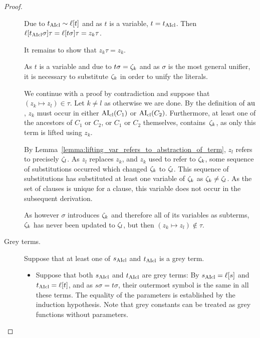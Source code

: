 \documentclass[,%
	paper=a4,%
	DIV14, %
	twoside=false,%
	liststotoc,
	bibtotoc,
	draft=false,%
	numbers=noendperiod
]{scrartcl}
\begin{document}
\begin{proof}
\begin{description}
\begin{compactitem}
				Due to $t_{\operatorname{AIcl}} \sim \ell[t]$ and as $t$ is a variable, $t=t_{\operatorname{AIcl}}$.
				Then $\ell[t_{\operatorname{AIcl}}\sigma]\tau = \ell[t\sigma]\tau = z_k\tau$.

				It remains to show that $z_k\tau = z_k$.

				As $t$ is a variable and due to $t\sigma = \zeta_{k}$ and as $\sigma$ is the most general unifier, it is necessary to substitute $\zeta_{k}$ in order to unify the literals. 

				We continue with a proof by contradiction and suppose that $(z_k \mapsto z_l) \in \tau$. Let $k\neq l$ as otherwise we are done.
				By the definition of $\operatorname{au}$, $z_k$ must occur in either $\operatorname{AI}_\mathrm{cl}(C_1)$ or $\operatorname{AI}_\mathrm{cl}(C_2)$.
				Furthermore, at least one of the ancestors of $C_1$ or $C_2$, or $C_1$ or $C_2$ themselves, contains~$\zeta_{k}$, as only this term is lifted using $z_k$.

				By Lemma~\ref{lemma:lifting_var_refers_to_abstraction_of_term}, $z_l$ refers to precisely $\zeta_{l}$. %
				As $z_l$ replaces $z_k$, and $z_k$ used to refer to $\zeta_{k}$,
				some sequence of substitutions occurred which changed $\zeta_{k}$ to $\zeta_{l}$.
				This sequence of substitutions has substituted at least one variable of $\zeta_{k}$ as $\zeta_{k}\neq\zeta_{l}$.
				As the set of clauses is unique for a clause, this variable does not occur in the subsequent derivation.

				As however $\sigma$ introduces $\zeta_{k}$ and therefore all of its variables as subterms, 
				$\zeta_{k}$ has never been updated to $\zeta_{l}$, but then $(z_k \mapsto z_l) \not\in \tau$.

			\end{compactitem}

		\item[Grey terms.]
			Suppose that at least one of $s_{\operatorname{AIcl}}$ and $t_{\operatorname{AIcl}}$ is a grey term.
			\begin{itemize}
				\item
					Suppose that both $s_{\operatorname{AIcl}}$ and $t_{\operatorname{AIcl}}$ are grey terms:
					By $s_{\operatorname{AIcl}} = \ell[s]$ and 
					$t_{\operatorname{AIcl}} = \ell[t]$, and as $s\sigma = t\sigma$, their outermost symbol is the same in all these terms.
					The equality of the parameters is established by the induction hypothesis.
					Note that grey constants can be treated as grey functions without parameters.


\end{itemize}
\end{description}
\end{proof}
\end{document}
